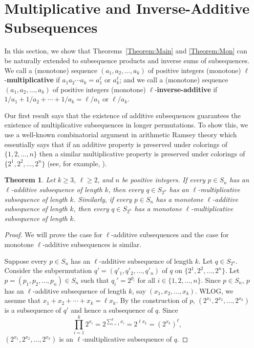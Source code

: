 \documentclass[11pt]{article}
\newtheorem{theorem}{Theorem}[section]
\theoremstyle{definition}
\begin{document}
\section{Multiplicative and Inverse-Additive Subsequences}\label{Section:Prod}
In this section, we show that Theorems~\ref{Theorem:Main} and \ref{Theorem:Mon} can be naturally extended to subsequence products and inverse sums of subsequences. We call a (monotone) sequence $(a_1,a_2,\ldots,a_k)$ of positive integers (monotone) $\ell$-\textbf{multiplicative} if $a_1a_2\cdots a_k=a_1^\ell$ or $a_k^\ell$; and we call a (monotone) sequence $(a_1,a_2,\ldots,a_k)$ of positive integers (monotone) $\ell$-\textbf{inverse-additive} if $1/a_1+1/a_2+\cdots+1/a_k=\ell/a_1$ or $\ell/a_k$.


Our first result says that the existence of additive subsequences guarantees the existence of multiplicative subsequences in longer permutations. To show this, we use a well-known combinatorial argument in arithmetic Ramsey theory which essentially says that if an additive property is preserved under colorings of $\{1,2,\ldots,n\}$ then a similar multiplicative property is preserved under colorings of $\{2^1,2^2,\ldots,2^n\}$ (see, for example, \cite{ACOS2025}).

\begin{theorem}\label{Theorem:MultiExistence}
Let $k\geq3$, $\ell\geq2$, and $n$ be positive integers. If every $p\in S_n$ has an $\ell$-additive subsequence of length $k$, then every $q\in S_{2^n}$ has an $\ell$-multiplicative subsequence of length $k$. Similarly, if every $p\in S_n$ has a monotone $\ell$-additive subsequence of length $k$, then every $q\in S_{2^n}$ has a monotone $\ell$-multiplicative subsequence of length $k$.
\end{theorem}
\begin{proof}
We will prove the case for $\ell$-additive subsequences and the case for monotone $\ell$-additive subsequences is similar.

    Suppose every $p\in S_n$ has an $\ell$-additive subsequence of length $k$. Let $q\in S_{2^n}$. Consider the subpermutation $q'=(q'_1,q'_2,\ldots,q'_n)$ of $q$ on $\{2^1, 2^2,\ldots,2^n\}$. Let $p=(p_1,p_2,\ldots,p_n)\in S_n$ such that $q_i' = 2^{p_i}$ for all $i\in\{1,2,\ldots,n\}$. Since $p\in S_n$, $p$ has an $\ell$-additive subsequence of length $k$, say $(x_1,x_2,\ldots,x_k)$. WLOG, we assume that $x_1+x_2+\cdots+x_k=\ell x_k$. By the construction of $p$, $(2^{x_1},2^{x_2},\ldots,2^{x_k})$ is a subsequence of $q'$ and hence a subsequence of $q$. Since
    \[
    \prod_{i=1}^k2^{x_i}=2^{\sum_{i=1}^kx_i}=2^{\ell x_k}=\left(2^{x_k}\right)^\ell,
    \]
    $(2^{x_1},2^{x_2},\ldots,2^{x_k})$ is an $\ell$-multiplicative subsequence of $q$.
\end{proof}
\end{document}
